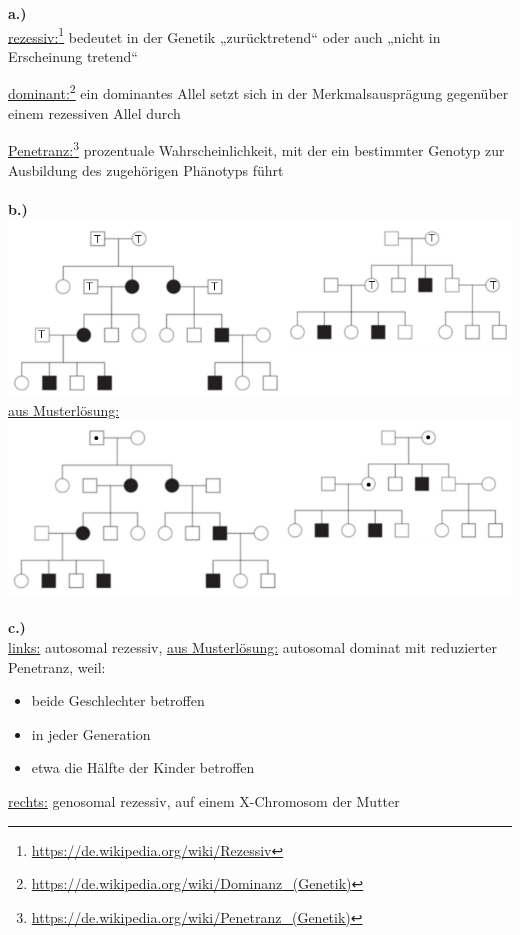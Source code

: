 \textbf{a.)}\\
\underline{rezessiv:}\footnote{\url{https://de.wikipedia.org/wiki/Rezessiv}} bedeutet in der Genetik „zurücktretend“ oder auch „nicht in Erscheinung tretend“

\underline{dominant:}\footnote{\url{https://de.wikipedia.org/wiki/Dominanz_(Genetik)}} ein dominantes Allel setzt sich in der Merkmalsausprägung gegenüber einem rezessiven Allel durch

\underline{Penetranz:}\footnote{\url{https://de.wikipedia.org/wiki/Penetranz_(Genetik)}} prozentuale Wahrscheinlichkeit, mit der ein bestimmter Genotyp zur Ausbildung des zugehörigen Phänotyps führt
\\\\
\textbf{b.)}\\
\includegraphics[width=1\textwidth]{lectures/V2/pix/stammbaeume1.png}
\newpage
\underline{aus Musterlösung:}\\
\includegraphics[width=1\textwidth]{lectures/V2/pix/standard_solution.png}
\\\\
\textbf{c.)}\\
\underline{links:} autosomal rezessiv, \underline{aus Musterlösung:} autosomal dominat mit reduzierter Penetranz, weil:
\begin{itemize}
	\item beide Geschlechter betroffen
	\item in jeder Generation
	\item etwa die Hälfte der Kinder betroffen
\end{itemize}

\underline{rechts:} genosomal rezessiv, auf einem X-Chromosom der Mutter\\
